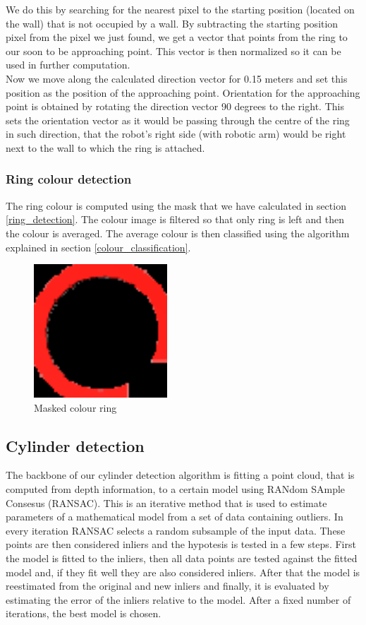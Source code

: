 \documentclass[12pt,a4paper]{article}
\begin{document}
	We do this by searching for the nearest pixel to the starting position (located on the wall) that is not occupied by a wall. By subtracting the starting position pixel from the pixel we just found, we get a vector that points from the ring to our soon to be approaching point. This vector is then normalized so it can be used in further computation. \\

	Now we move along the calculated direction vector for 0.15 meters and set this position as the position of the approaching point. Orientation for the approaching point is obtained by rotating the direction vector 90 degrees to the right. This sets the orientation vector as it would be passing through the centre of the ring in such direction, that the robot's right side (with robotic arm) would be right next to the wall to which the ring is attached.

	\subsubsection{Ring colour detection}
	The ring colour is computed using the mask that we have calculated in section \ref{ring_detection}. The colour  image is filtered so that only ring is left and then the colour is averaged. The average colour is then classified using the algorithm explained in section \ref{colour_classification}.
	
	\begin{figure}[h]
		\centering
		\includegraphics[height=5cm]{images/ring_detection_colour}
		\caption{Masked colour ring}
		\label{fig:masked_colour_ring}
	\end{figure}
		
	\subsection{Cylinder detection}
	The backbone of our cylinder detection algorithm is fitting a point cloud, that is computed from depth information, to a certain model using RANdom SAmple Consesus (RANSAC). This is an iterative method that is used to estimate parameters of a mathematical model from a set of data containing outliers. In every iteration RANSAC selects a random subsample of the input data. These points are then considered inliers and the hypotesis is tested in a few steps. First the model is fitted to the inliers, then all data points are tested against the fitted model and, if they fit well they are also considered inliers. After that the model is reestimated from the original and new inliers and finally, it is evaluated by estimating the error of the inliers relative to the model. After a fixed number of iterations, the best model is chosen. \\
\end{document}
